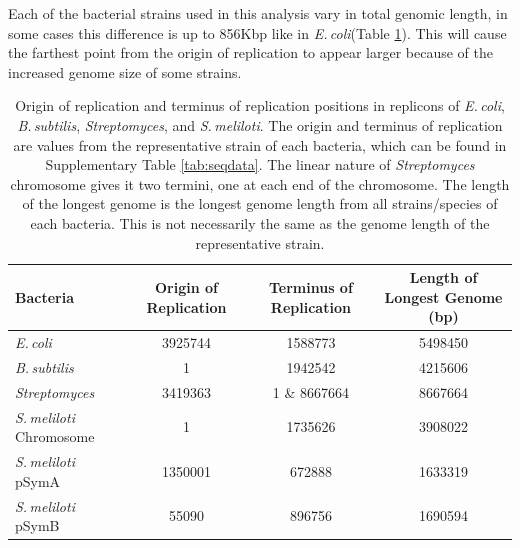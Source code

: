 \documentclass[11pt]{article}
\newcommand{\smel}{\textit{S.\,meliloti}\xspace}
\newcommand{\strep}{\textit{Streptomyces}\xspace}
\newcommand{\ecol}{\textit{E.\,coli}\xspace}
\newcommand{\bass}{\textit{B.\,subtilis}\xspace}
\begin{document}
Each of the bacterial strains used in this analysis vary in total genomic length, in some cases this difference is up to 856Kbp like in \ecol (Table \ref{tab:oriloc}). 
This will cause the farthest point from the origin of replication to appear larger because of the increased genome size of some strains.


	\begin{table}[H]
		\begin{center}
			\begin{tabular}{lccc}
				\toprule
				Bacteria & Origin of Replication & Terminus of Replication & Length of Longest Genome (bp)\\
				\midrule
				\ecol & 3925744 & 1588773 & 5498450 \\
				\bass & 1 & 1942542 & 4215606\\
				\strep & 3419363 & 1 \& 8667664 & 8667664\\
				\smel Chromosome & 1 & 1735626 & 3908022\\
				\smel pSymA & 1350001 & 672888 & 1633319\\
				\smel pSymB & 55090 & 896756 & 1690594\\
				\bottomrule
			\end{tabular}
			\caption{\label{tab:oriloc} Origin of replication and terminus of replication positions in replicons of \ecol, \bass, \strep, and \smel. The origin and terminus of replication are values from the representative strain of each bacteria, which can be found in Supplementary Table \ref{tab:seqdata}. The linear nature of \strep chromosome gives it two termini, one at each end of the chromosome. The length of the longest genome is the longest genome length from all strains/species of each bacteria. This is not necessarily the same as the genome length of the representative strain.}
		\end{center}
	\end{table}
	
\end{document}
